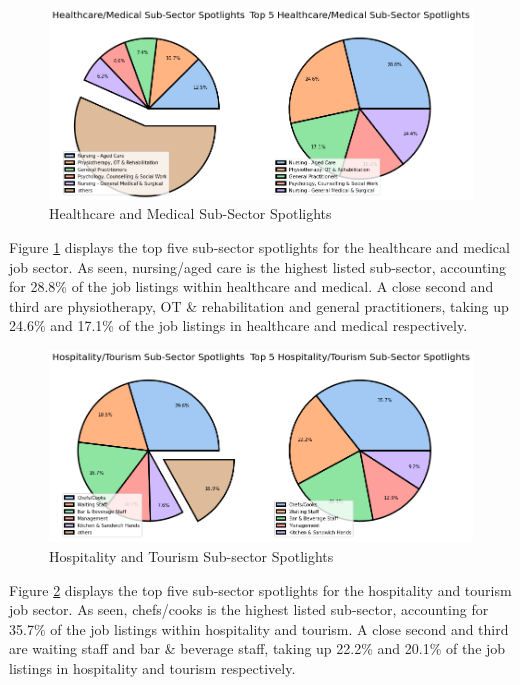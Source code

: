 \documentclass[twoside, 12pt, a4paper]{article}
\begin{document}
\newpage
\begin{figure}[h]
	\centering
	\includegraphics[scale = 0.50]{Healthspotlight.png}
	\caption{Healthcare and Medical Sub-Sector Spotlights}
	\label{fig:Healthspotlight}
\end{figure}

Figure \ref{fig:Healthspotlight} displays the top five sub-sector spotlights for the healthcare and medical job sector. As seen, nursing/aged care is the highest listed sub-sector, accounting for 28.8\% of the job listings within healthcare and medical. A close second and third are physiotherapy, OT \& rehabilitation and general practitioners, taking up 24.6\% and 17.1\% of the job listings in healthcare and medical respectively. 

\begin{figure}[h]
	\centering
	\includegraphics[scale = 0.50]{Hopsspotlight.png}
	\caption{Hospitality and Tourism Sub-sector Spotlights}
	\label{fig:Hospspotlight}
\end{figure}

Figure \ref{fig:Hospspotlight} displays the top five sub-sector spotlights for the hospitality and tourism job sector. As seen, chefs/cooks is the highest listed sub-sector, accounting for 35.7\% of the job listings within hospitality and tourism. A close second and third are waiting staff and bar \& beverage staff, taking up 22.2\% and 20.1\% of the job listings in hospitality and tourism respectively. 
\end{document}
